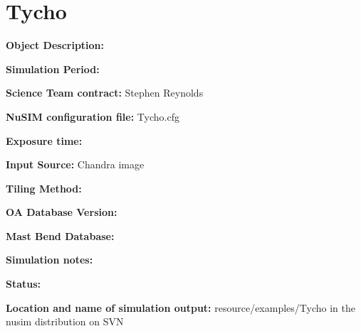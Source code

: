 
\newpage

\section{Tycho}

\textbf{Object Description:}

\textbf{Simulation Period:} 

\textbf{Science Team contract:} Stephen Reynolds

\textbf{NuSIM configuration file:} Tycho.cfg

\textbf{Exposure time:}

\textbf{Input Source:} Chandra image

\textbf{Tiling Method:}

\textbf{OA Database Version:} 

\textbf{Mast Bend Database:} 

\textbf{Simulation notes:} 

\textbf{Status:} 

\textbf{Location and name of simulation output:} resource/examples/Tycho in the nusim distribution on SVN


